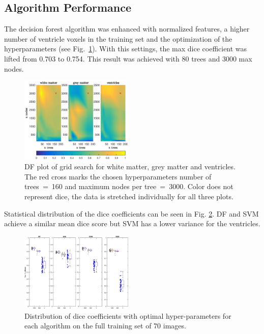 \documentclass[journal]{IEEEtran}
\begin{document}
\subsection{Algorithm Performance}



The decision forest algorithm was enhanced with normalized features, a higher number of ventricle voxels in the training set and the optimization of the hyperparameters (see Fig.~\ref{f.df_white}). With this settings, the max dice coefficient was lifted from 0.703 to 0.754. This result was achieved with 80 trees and 3000 max nodes.

\begin{figure}[h!]\label{f.df_white}
	\centering
	\includegraphics[width=0.48\textwidth]{images/df_grid}
	\caption{DF plot of grid search for white matter, grey matter and ventricles. The red cross marks the chosen hyperparameters number of trees~=~160 and maximum nodes per tree~=~3000. Color does not represent dice, the data is stretched individually for all three plots.}
\end{figure}



Statistical distribution of the dice coefficients can be seen in Fig. \ref{f.boxplot}. DF and SVM achieve a similar mean dice score but SVM has a lower variance for the ventricles.
\begin{figure}\label{f.boxplot}
	\centering
	\includegraphics[width=0.48\textwidth]{images/boxplot}
	\caption{Distribution of dice coefficients with optimal hyper-parameters for each algorithm on the full training set of 70 images.}
\end{figure}
\end{document}
